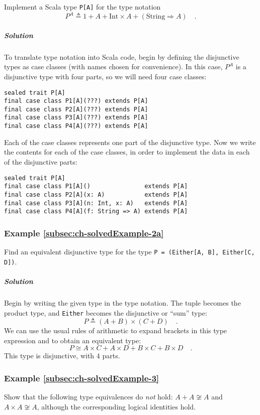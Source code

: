 Implement a Scala type \lstinline!P[A]! for the type notation 
\[
P^{A}\triangleq1+A+\text{Int}\times A+(\text{String}\Rightarrow A)\quad.
\]


\subparagraph{Solution}

To translate type notation into Scala code, begin by defining the
disjunctive types as case classes (with names chosen for convenience).
In this case, $P^{A}$ is a disjunctive type with four parts, so we
will need four case classes:
\begin{lstlisting}
sealed trait P[A]
final case class P1[A](???) extends P[A]
final case class P2[A](???) extends P[A]
final case class P3[A](???) extends P[A]
final case class P4[A](???) extends P[A]
\end{lstlisting}
Each of the case classes represents one part of the disjunctive type.
Now we write the contents for each of the case classes, in order to
implement the data in each of the disjunctive parts:
\begin{lstlisting}
sealed trait P[A]
final case class P1[A]()               extends P[A]
final case class P2[A](x: A)           extends P[A]
final case class P3[A](n: Int, x: A)   extends P[A]
final case class P4[A](f: String => A) extends P[A]
\end{lstlisting}


\subsubsection{Example \label{subsec:ch-solvedExample-2a}\ref{subsec:ch-solvedExample-2a}}

Find an equivalent disjunctive type for the type \lstinline!P = (Either[A, B], Either[C, D])!.

\subparagraph{Solution}

Begin by writing the given type in the type notation. The tuple becomes
the product type, and \lstinline!Either! becomes the disjunctive
or ``sum'' type:
\[
P\triangleq(A+B)\times(C+D)\quad.
\]
We can use the usual rules of arithmetic to expand brackets in this
type expression and to obtain an equivalent type:
\[
P\cong A\times C+A\times D+B\times C+B\times D\quad.
\]
This type is disjunctive, with $4$ parts.

\subsubsection{Example \label{subsec:ch-solvedExample-3}\ref{subsec:ch-solvedExample-3}}

Show that the following type equivalences do \emph{not} hold: $A+A\not\cong A$
and $A\times A\not\cong A$, although the corresponding logical identities
hold.

